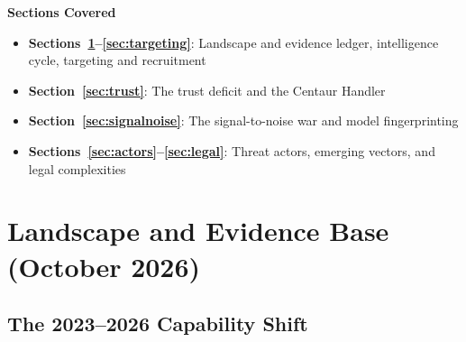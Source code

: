 \documentclass[11pt,letterpaper]{article}
\begin{document}
\vspace{0.8cm}
\begin{center}
\begin{minipage}{0.9\textwidth}
\begin{tcolorbox}[enhanced, colback=white, colframe=steelblue!40, boxrule=1pt, arc=4pt,
  left=15pt, right=15pt, top=12pt, bottom=12pt]
\textcolor{shadowdark}{\textbf{Sections Covered}}
\vspace{0.4em}
\begin{itemize}[nosep]
  \item \textbf{Sections~\ref{sec:landscape}--\ref{sec:targeting}}: Landscape and evidence ledger, intelligence cycle, targeting and recruitment
  \item \textbf{Section~\ref{sec:trust}}: The trust deficit and the Centaur Handler
  \item \textbf{Section~\ref{sec:signalnoise}}: The signal-to-noise war and model fingerprinting
  \item \textbf{Sections~\ref{sec:actors}--\ref{sec:legal}}: Threat actors, emerging vectors, and legal complexities
\end{itemize}
\end{tcolorbox}
\end{minipage}
\end{center}


\section{Landscape and Evidence Base (October 2026)}\label{sec:landscape}

\subsection{The 2023--2026 Capability Shift}
\end{document}
